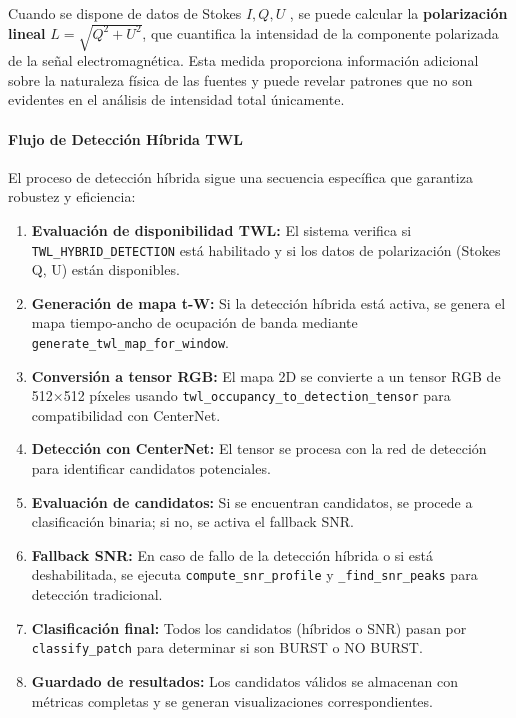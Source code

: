 Cuando se dispone de datos de Stokes $I,Q,U$ \cite{hamaker1996understanding}, se puede calcular la \textbf{polarización lineal} $L=\sqrt{Q^2+U^2}$, que cuantifica la intensidad de la componente polarizada de la señal electromagnética. Esta medida proporciona información adicional sobre la naturaleza física de las fuentes y puede revelar patrones que no son evidentes en el análisis de intensidad total únicamente.

\paragraph{Flujo de Detección Híbrida TWL}

El proceso de detección híbrida sigue una secuencia específica que garantiza robustez y eficiencia:

\begin{enumerate}
\item \textbf{Evaluación de disponibilidad TWL:} El sistema verifica si \texttt{TWL\_HYBRID\_DETECTION} está habilitado y si los datos de polarización (Stokes Q, U) están disponibles.
\item \textbf{Generación de mapa t-W:} Si la detección híbrida está activa, se genera el mapa tiempo-ancho de ocupación de banda mediante \texttt{generate\_twl\_map\_for\_window}.
\item \textbf{Conversión a tensor RGB:} El mapa 2D se convierte a un tensor RGB de 512×512 píxeles usando \texttt{twl\_occupancy\_to\_detection\_tensor} para compatibilidad con CenterNet.
\item \textbf{Detección con CenterNet:} El tensor se procesa con la red de detección para identificar candidatos potenciales.
\item \textbf{Evaluación de candidatos:} Si se encuentran candidatos, se procede a clasificación binaria; si no, se activa el fallback SNR.
\item \textbf{Fallback SNR:} En caso de fallo de la detección híbrida o si está deshabilitada, se ejecuta \texttt{compute\_snr\_profile} y \texttt{\_find\_snr\_peaks} para detección tradicional.
\item \textbf{Clasificación final:} Todos los candidatos (híbridos o SNR) pasan por \texttt{classify\_patch} para determinar si son BURST o NO BURST.
\item \textbf{Guardado de resultados:} Los candidatos válidos se almacenan con métricas completas y se generan visualizaciones correspondientes.
\end{enumerate}

